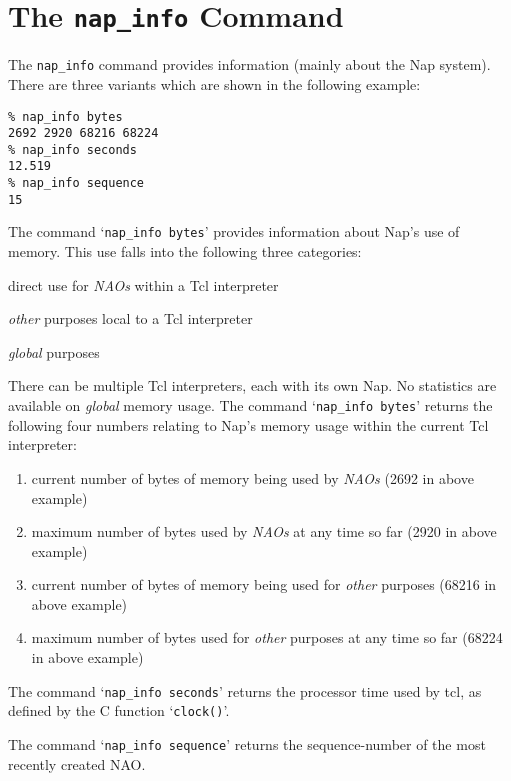
\section{The \texttt{nap\_info} Command}
    \label{nap-info}

The 
  \texttt{nap\_info} command provides information (mainly about the
  Nap system). There are three variants which are shown in the
  following example:
  \begin{verbatim}
% nap_info bytes
2692 2920 68216 68224
% nap_info seconds
12.519
% nap_info sequence
15
\end{verbatim}

  

The command `\texttt{nap\_info bytes}' provides information about
  Nap's use of memory. This use falls into the following three
  categories:
\begin{bullets}
    \item direct use for 
    \emph{NAOs} within a Tcl interpreter
    \item 
    \emph{other} purposes local to a Tcl interpreter
    \item 
    \emph{global} purposes
\end{bullets}
There can be multiple Tcl interpreters, each with its own Nap.
  No statistics are available on 
  \emph{global} memory usage. The command `\texttt{nap\_info bytes}' returns the following four numbers
  relating to Nap's memory usage within the current Tcl
  interpreter:
  \begin{enumerate}
    \item current number of bytes of memory being used by 
    \emph{NAOs} (2692 in above example)
    \item maximum number of bytes used by 
    \emph{NAOs} at any time so far (2920 in above example)
    \item current number of bytes of memory being used for 
    \emph{other} purposes (68216 in above example)
    \item maximum number of bytes used for 
    \emph{other} purposes at any time so far (68224 in above
    example)
  \end{enumerate}
  

The command `\texttt{nap\_info seconds}' returns the processor time used
  by tcl, as defined by the C function `\texttt{clock()}'.
  

The command `\texttt{nap\_info sequence}' returns the sequence-number of
  the most recently created NAO.
